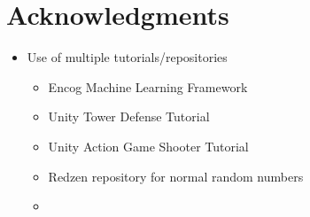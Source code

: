 \documentclass[letterpaper]{article}
\begin{document}
\section{Acknowledgments}
\begin{itemize}
    \item Use of multiple tutorials/repositories
    \begin{itemize}
        \item Encog Machine Learning Framework
        \item Unity Tower Defense Tutorial
        \item Unity Action Game Shooter Tutorial
        \item Redzen repository for normal random numbers
        \item
    \end{itemize}
\end{itemize}

\footnotesize

\end{document}
